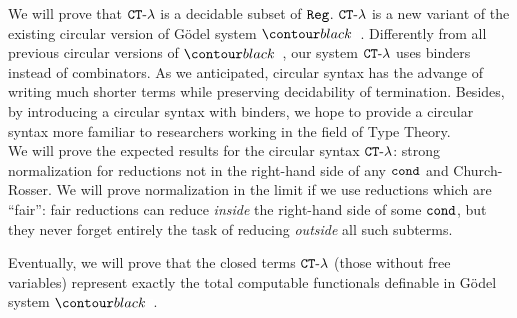 We will prove that ${ {\tt CT} \mbox{-} \lambda}$ is a decidable subset of ${\tt Reg}$.
${ {\tt CT} \mbox{-} \lambda}$ is a new variant of the existing circular version of G\"{o}del system $\systemT$. 
Differently from all previous circular versions of $\systemT$, our system ${ {\tt CT} \mbox{-} \lambda}$
uses binders instead of combinators. 
As we anticipated, 
 circular syntax has the advange of writing much shorter terms while preserving decidability of termination.
Besides, by introducing a circular syntax with binders, we hope to provide 
a circular syntax more familiar to researchers working in the field of Type Theory.
\\

We will prove the expected results for the circular syntax ${ {\tt CT} \mbox{-} \lambda}$:
strong normalization for reductions not in the right-hand side of any ${\tt cond}$ and Church-Rosser. 
We will prove normalization in the limit if we use reductions which are ``fair'':
fair reductions can reduce \emph{inside} the right-hand side of some ${\tt cond}$, but they never forget entirely 
the task of reducing \emph{outside} all such subterms.

Eventually, we will prove that the closed terms ${ {\tt CT} \mbox{-} \lambda}$ (those without free variables)
represent exactly the total computable functionals definable in G\"{o}del system $\systemT$.



